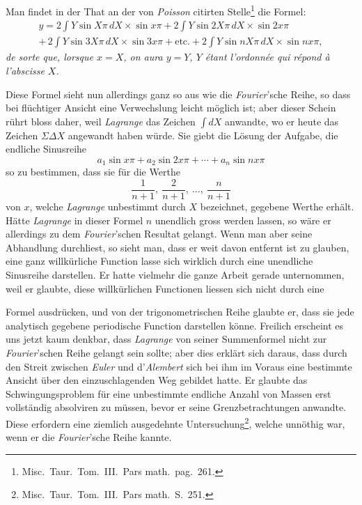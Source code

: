 \documentclass[12pt,a4paper]{book}
\theoremstyle{definition}
\theoremstyle{remark}
\begin{document}
Man findet in der That an der von \textit{Poisson} citirten Stelle\footnote{Misc.\ Taur.\ Tom.~III.\ Pars math.\ pag.~261.} die Formel:
\begin{multline*}
y = 2\!\int\! Y\sin X\pi\,dX \times \sin x\pi + 2\!\int\! Y\sin 2X\pi\,dX \times \sin 2x\pi\\
+\, 2\!\int\! Y\sin 3X\pi\,dX \times \sin 3x\pi + \text{etc.} + 2\!\int\! Y\sin nX\pi\,dX \times \sin nx\pi,
\end{multline*}
\textit{de sorte que, lorsque $x = X$, on aura $y = Y$, $Y$ étant l'ordonnée qui répond à l'abscisse $X$.}

Diese Formel sieht nun allerdings ganz so aus wie die \textit{Fourier}'sche Reihe, so dass bei flüchtiger Ansicht eine Verwechslung leicht möglich ist; aber dieser Schein rührt bloss daher, weil \textit{Lagrange} das Zeichen $\int\!dX$ anwandte, wo er heute das Zeichen $\Sigma\Delta X$ angewandt haben würde. Sie giebt die Lösung der Aufgabe, die endliche Sinusreihe
\[ a_1\sin x\pi + a_2\sin 2x\pi + \cdots + a_n\sin nx\pi \]
so zu bestimmen, dass sie für die Werthe
\[ \frac{1}{n+1},\ \frac{2}{n+1},\ \ldots,\ \frac{n}{n+1} \]
von $x$, welche \textit{Lagrange} unbestimmt durch $X$ bezeichnet, gegebene Werthe erhält. Hätte \textit{Lagrange} in dieser Formel $n$ unendlich gross werden lassen, so wäre er allerdings zu dem \textit{Fourier}'schen Resultat gelangt. Wenn man aber seine Abhandlung durchliest, so sieht man, dass er weit davon entfernt ist zu glauben, eine ganz willkürliche Function lasse sich wirklich durch eine unendliche Sinusreihe darstellen. Er hatte vielmehr die ganze Arbeit gerade unternommen, weil er glaubte, diese willkürlichen Functionen liessen sich nicht durch eine

\newpage

Formel ausdrücken, und von der trigonometrischen Reihe glaubte er, dass sie jede analytisch gegebene periodische Function darstellen könne. Freilich erscheint es uns jetzt kaum denkbar, dass \textit{Lagrange} von seiner Summenformel nicht zur \textit{Fourier}'schen Reihe gelangt sein sollte; aber dies erklärt sich daraus, dass durch den Streit zwischen \textit{Euler} und d'\textit{Alembert} sich bei ihm im Voraus eine bestimmte Ansicht über den einzuschlagenden Weg gebildet hatte. Er glaubte das Schwingungsproblem für eine unbestimmte endliche Anzahl von Massen erst vollständig absolviren zu müssen, bevor er seine Grenzbetrachtungen anwandte. Diese erfordern eine ziemlich ausgedehnte Untersuchung\footnote{Misc.\ Taur.\ Tom.~III.\ Pars math.\ S.~251.}, welche unnöthig war, wenn er die \textit{Fourier}'sche Reihe kannte.
\end{document}
